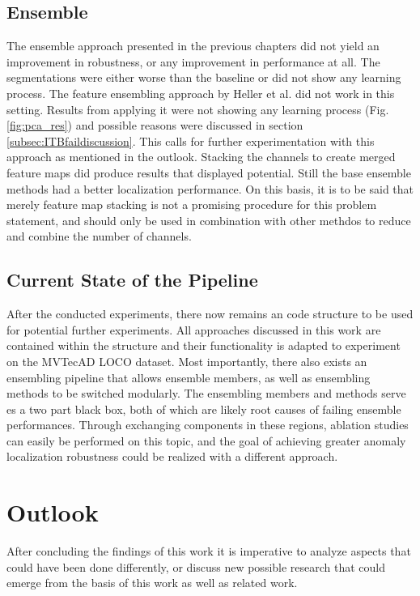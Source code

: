 \subsection{Ensemble}
The ensemble approach presented in the previous chapters did not yield an improvement in robustness, or any improvement in performance at all. The segmentations were either 
worse than the baseline or did not show any learning process. The feature ensembling approach by Heller et al. \cite{EnsembleHeller2023} did not work in this setting. Results from applying it were not showing any learning 
process (Fig. \ref{fig:pca_res}) and possible reasons were discussed in section \ref{subsec:ITBfaildiscussion}. This calls for further experimentation with this approach as mentioned 
in the outlook. Stacking the channels to create merged feature maps did produce results that displayed potential. Still the base ensemble methods had a better localization 
performance. On this basis, it is to be said that merely feature map stacking is not a promising procedure for this problem statement, and should only be used in combination 
with other methdos to reduce and combine the number of channels.

\subsection{Current State of the Pipeline}
After the conducted experiments, there now remains an code structure to be used for potential further experiments. 
All approaches discussed in this work are contained within the structure and their functionality is adapted to experiment on the MVTecAD LOCO \cite{LOCODentsAndScratchesBergmann2022} dataset. Most 
importantly, there also exists an ensembling pipeline that allows ensemble members, as well as ensembling methods to be switched modularly. The ensembling members and methods 
serve es a two part black box, both of which are likely root causes of failing ensemble performances. 
Through exchanging components in these regions, ablation studies can easily be performed on this topic, and the goal of achieving greater anomaly localization robustness 
could be realized with a different approach.


\section{Outlook}
\label{sec:finaloutlook}

After concluding the findings of this work it is imperative to analyze aspects that could have been done differently, or discuss new possible research that could emerge from 
the basis of this work as well as related work.\newline

